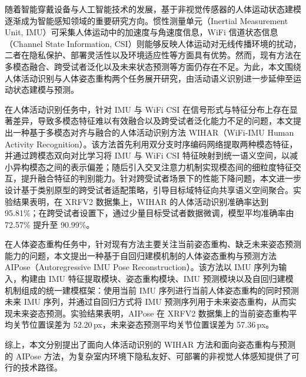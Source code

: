 \begin{chineseabstract}

随着智能穿戴设备与人工智能技术的发展，基于非视觉传感器的人体运动状态建模逐渐成为智能感知领域的重要研究方向。惯性测量单元（Inertial Measurement Unit, IMU）可采集人体运动中的加速度与角速度信息，WiFi 信道状态信息（Channel State Information, CSI）则能够反映人体运动对无线传播环境的扰动，二者在隐私保护、部署灵活性以及环境适应性等方面具有优势。然而，现有方法在多模态融合、跨受试者泛化以及未来状态预测等方面仍存在不足。为此，本文围绕人体活动识别与人体姿态重构两个任务展开研究，由活动语义识别进一步延伸至运动状态建模与预测。

在人体活动识别任务中，针对 IMU 与 WiFi CSI 在信号形式与特征分布上存在显著差异，导致多模态特征难以有效融合以及跨受试者泛化能力不足的问题，本文提出一种基于多模态对齐与融合的人体活动识别方法 WIHAR（WiFi-IMU Human Activity Recognition）。该方法首先利用双分支时序编码网络提取两种模态特征，并通过跨模态双向对比学习将 IMU 与 WiFi CSI 特征映射到统一语义空间，以减小异构模态之间的表示偏差；随后引入交叉注意力机制实现模态间的细粒度特征交互，提升融合特征的判别能力。针对跨受试者场景下的性能下降问题，本文进一步设计基于类别原型的跨受试者适配策略，引导目标域特征向共享语义空间聚合。实验结果表明，在 XRFV2 数据集上，WIHAR 的人体活动识别准确率达到 95.81\%；在跨受试者设置下，通过少量目标受试者数据微调，模型平均准确率由 72.57\% 提升至 90.99\%。
    
在人体姿态重构任务中，针对现有方法主要关注当前姿态重构、缺乏未来姿态预测能力的问题，本文提出一种基于自回归建模机制的人体姿态重构与预测方法 AIPose（Autoregressive IMU Pose Reconstruction）。该方法以 IMU 序列为输入，构建由 IMU 特征提取模块、姿态重构模块、IMU 预测模块以及自回归建模机制组成的统一建模框架：使用当前 IMU 序列进行当前人体姿态重构的同时预测未来 IMU 序列，并通过自回归方式将 IMU 预测序列用于未来姿态重构，从而实现未来姿态预测。实验结果表明，AIPose 在 XRFV2 数据集上的当前姿态重构平均关节位置误差为 52.20\,px，未来姿态预测平均关节位置误差为 57.36\,px。

综上，本文分别提出了面向人体活动识别的 WIHAR 方法和面向姿态重构与预测的 AIPose 方法，为复杂室内环境下隐私友好、可部署的非视觉人体感知提供了可行的技术路径。

    
\end{chineseabstract}